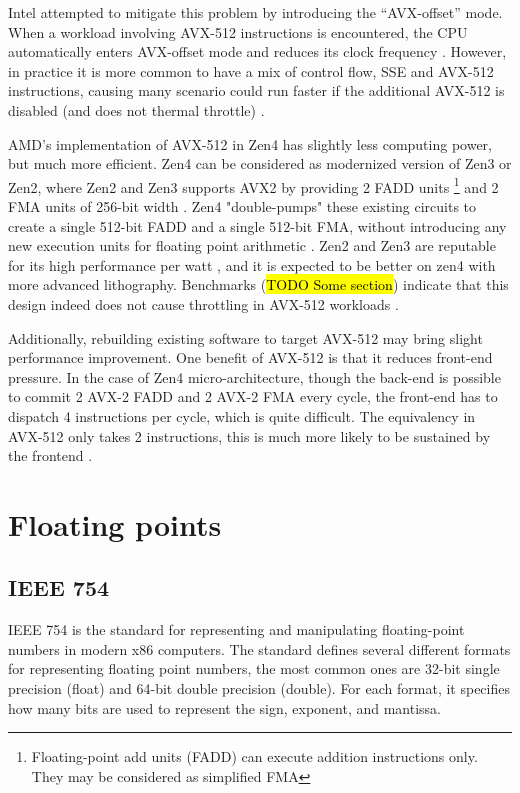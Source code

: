 \documentclass[logo,bsc,singlespacing,parskip]{infthesis}
\begin{document}
Intel attempted to mitigate this problem by introducing the ``AVX-offset'' mode.
When a workload involving AVX-512 instructions is encountered, the CPU
automatically enters AVX-offset mode and reduces its clock frequency
\cite{AVX-offset}. However, in practice it is more common to have a mix of
control flow, SSE and AVX-512 instructions, causing many scenario could run
faster if the additional AVX-512 is disabled (and does not thermal throttle)
\cite{Zen4Critique}.

AMD’s implementation of AVX-512 in Zen4 has slightly less computing power, but
much more efficient. Zen4 can be considered as modernized version of Zen3 or
Zen2, where Zen2 and Zen3 supports AVX2 by providing 2 FADD units
\footnote{Floating-point add units (FADD) can execute addition instructions
only. They may be considered as simplified FMA} and 2 FMA units of 256-bit width
\cite{Zen2ChipWiki}. Zen4 "double-pumps" these existing circuits to create a
single 512-bit FADD and a single 512-bit FMA, without introducing any new
execution units for floating point arithmetic \cite{Zen4Critique}. Zen2 and Zen3
are reputable for its high performance per watt \cite{ZenPerfPerWatt}, and it is
expected to be better on zen4 with more advanced lithography. Benchmarks
(\hl{TODO Some section}) indicate that this design indeed does not cause
throttling in AVX-512 workloads \cite{Zen4Critique}.

Additionally, rebuilding existing software to target AVX-512 may bring slight
performance improvement. One benefit of AVX-512 is that it reduces front-end
pressure. In the case of Zen4 micro-architecture, though the back-end is
possible to commit 2 AVX-2 FADD and 2 AVX-2 FMA every cycle, the front-end
has to dispatch 4 instructions per cycle, which is quite difficult. The
equivalency in AVX-512 only takes 2 instructions, this is much more likely to be
sustained by the frontend \cite{Zen4Critique}.


\section{Floating points}
\label{sec:i23}
\subsection{IEEE 754}
IEEE 754 is the standard for representing and manipulating floating-point
numbers in modern x86 computers. The standard defines several different formats
for representing floating point numbers, the most common ones are 32-bit single
precision (float) and 64-bit double precision (double). For each format, it
specifies how many bits are used to represent the sign, exponent, and mantissa. 
\end{document}
